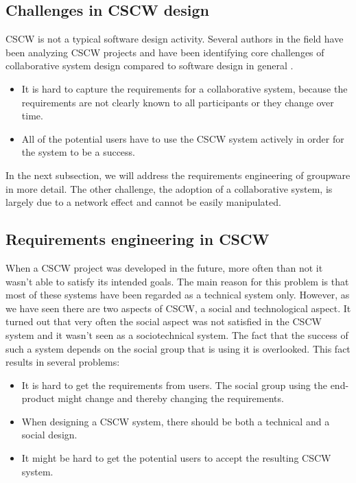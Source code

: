 \subsection{Challenges in CSCW design}

CSCW is not a typical software design activity. Several authors in the field have been analyzing CSCW projects and have been identifying core challenges of collaborative system design compared to software design in general \cite{CSCWConcepts}. 

\begin{itemize}
\item{It is hard to capture the requirements for a collaborative system, because the requirements are not clearly known to all participants or they change over time.}
\item{All of the potential users have to use the CSCW system actively in order for the system to be a success.}
\end{itemize}

In the next subsection, we will address the requirements engineering of groupware in more detail. The other challenge, the adoption of a collaborative system, is largely due to a network effect and cannot be easily manipulated.

\subsection{Requirements engineering in CSCW}

When a CSCW project was developed in the future, more often than not it wasn't able to satisfy its intended goals. The main reason for this problem is that most of these systems have been regarded as a technical system only. However, as we have seen there are two aspects of CSCW, a social and technological aspect. It turned out that very often the social aspect was not satisfied in the CSCW system and it wasn't seen as a sociotechnical system. The fact that the success of such a system depends on the social group that is using it is overlooked. This fact results in several problems:

\begin{itemize}
\item{It is hard to get the requirements from users. The social group using the end-product might change and thereby changing the requirements.}
\item{When designing a CSCW system, there should be both a technical and a social design.}
\item{It might be hard to get the potential users to accept the resulting CSCW system.}
\end{itemize}

